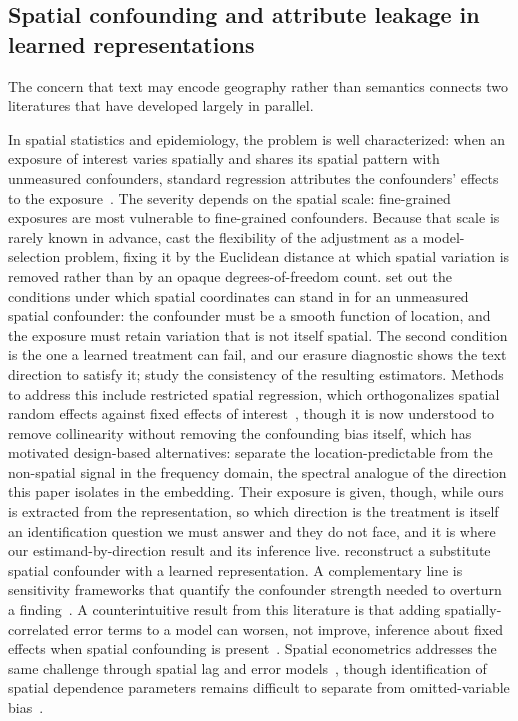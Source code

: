 \documentclass{article}
\begin{document}
\subsection{Spatial confounding and attribute leakage in learned representations}

The concern that text may encode geography rather than semantics connects two literatures that have developed largely in parallel.

In spatial statistics and epidemiology, the problem is well characterized: when an exposure of interest varies spatially and shares its spatial pattern with unmeasured confounders, standard regression attributes the confounders' effects to the exposure~\citep{paciorek2010importance}. The severity depends on the spatial scale: fine-grained exposures are most vulnerable to fine-grained confounders. Because that scale is rarely known in advance, \citet{keller2020selecting} cast the flexibility of the adjustment as a model-selection problem, fixing it by the Euclidean distance at which spatial variation is removed rather than by an opaque degrees-of-freedom count. \citet{gilbert2021causal} set out the conditions under which spatial coordinates can stand in for an unmeasured spatial confounder: the confounder must be a smooth function of location, and the exposure must retain variation that is not itself spatial. The second condition is the one a learned treatment can fail, and our erasure diagnostic shows the text direction to satisfy it; \citet{gilbert2024consistency} study the consistency of the resulting estimators. Methods to address this include restricted spatial regression, which orthogonalizes spatial random effects against fixed effects of interest~\citep{reich2021spatial}, though it is now understood to remove collinearity without removing the confounding bias itself, which has motivated design-based alternatives: \citet{guan2023spectral} separate the location-predictable from the non-spatial signal in the frequency domain, the spectral analogue of the direction this paper isolates in the embedding. Their exposure is given, though, while ours is extracted from the representation, so which direction is the treatment is itself an identification question we must answer and they do not face, and it is where our estimand-by-direction result and its inference live. \citet{khot2025spatial} reconstruct a substitute spatial confounder with a learned representation. A complementary line is sensitivity frameworks that quantify the confounder strength needed to overturn a finding~\citep{cinelli2020making}. A counterintuitive result from this literature is that adding spatially-correlated error terms to a model can worsen, not improve, inference about fixed effects when spatial confounding is present~\citep{hodges2010spatial}. Spatial econometrics addresses the same challenge through spatial lag and error models~\citep{anselin1988spatial,lesage2009introduction,elhorst2014spatial}, though identification of spatial dependence parameters remains difficult to separate from omitted-variable bias~\citep{gibbons2014spatial}.
\end{document}
